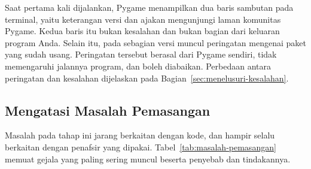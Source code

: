 \begin{catatabox}
Saat pertama kali dijalankan, Pygame menampilkan dua baris sambutan pada
terminal, yaitu keterangan versi dan ajakan mengunjungi laman komunitas
Pygame. Kedua baris itu bukan kesalahan dan bukan bagian dari keluaran
program Anda. Selain itu, pada sebagian versi muncul peringatan mengenai
paket  yang sudah usang. Peringatan tersebut berasal dari
Pygame sendiri, tidak memengaruhi jalannya program, dan boleh diabaikan.
Perbedaan antara peringatan dan kesalahan dijelaskan pada
Bagian~\ref{sec:menelusuri-kesalahan}.
\end{catatabox}

\subsection{Mengatasi Masalah Pemasangan}

Masalah pada tahap ini jarang berkaitan dengan kode, dan hampir selalu
berkaitan dengan penafsir yang dipakai. Tabel~\ref{tab:masalah-pemasangan}
memuat gejala yang paling sering muncul beserta penyebab dan tindakannya.


